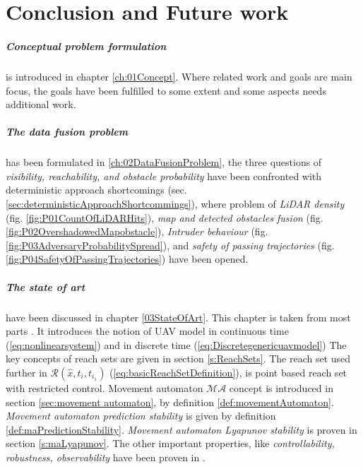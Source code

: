 \chapter{Conclusion and Future work}\label{ch:07Conclusion}
\paragraph{Conceptual problem formulation} is introduced in chapter \ref{ch:01Concept}. Where related work and goals are main focus, the goals have been fulfilled to some extent and some aspects needs additional work. 

\paragraph{The \emph{data fusion problem}} has been formulated in \ref{ch:02DataFusionProblem}, the three questions of \emph{visibility, reachability, and obstacle probability} have been confronted with deterministic approach shortcomings (sec. \ref{sec:deterministicApproachShortcommings}), where problem of \emph{LiDAR density} (fig. \ref{fig:P01CountOfLiDARHits}), \emph{map and detected obstacles fusion} (fig. \ref{fig:P02OvershadowedMapobstacle}), \emph{Intruder behaviour} (fig. \ref{fig:P03AdversaryProbabilitySpread}), and \emph{safety of passing trajectories} (fig. \ref{fig:P04SafetyOfPassingTrajectories}) have been opened.

\paragraph{The state of art} have been discussed in chapter \ref{03StateOfArt}. This chapter is taken from most parts \cite{alojzgomola2017}. It introduces the notion of UAV model in continuous time (\ref{eq:nonlinearsystem}) and in discrete time (\ref{eq:Discretegenericuavmodel}) The key concepts of reach sets are given in section \ref{s:ReachSets}. The reach set used further in $\mathscr{R}(\hat{x},t_i,t_{i_1})$ (\ref{eq:basicReachSetDefinition}), is point based reach set with restricted control. Movement automaton $\mathscr{MA}$ concept is introduced in section \ref{sec:movement automaton}, by definition \ref{def:movementAutomaton}. \emph{Movement automaton prediction stability} is given by definition \ref{def:maPredictionStability}. \emph{Movement automaton Lyapunov stability} is proven in section \ref{s:maLyapunov}. The other important properties, like \emph{controllability, robustness, observability} have been proven in \cite{frazzoli2000trajectory}.


